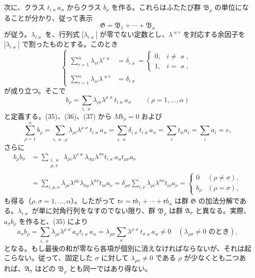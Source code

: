 次に、クラス $t_{i\varkappa}a_\varkappa$ からクラス $b_\rho$ を作る。これらはふたたび群 $\mathfrak B_\rho$ の単位になることが分かり、従って表示
\[
 \mathfrak G=\mathfrak B_1+\cdots+\mathfrak B_\alpha
\]
が従う。$\lambda_{i\varkappa}$ を、行列式 $|\lambda_{i\varkappa}|$ が零でない定数とし、$\lambda^{\varkappa r}$ を対応する余因子を $|\lambda_{i\varkappa}|$ で割ったものとする。このとき
\begin{equation}
\left\{
\begin{aligned}
 \sum_{r=1}^{\alpha}\lambda_{ri}\lambda^{r\varkappa}&=\delta_{i\varkappa}=\begin{cases}0,&i\ne\varkappa,\\1,&i=\varkappa,
 \end{cases}\\
 \sum_{r=1}^{\alpha}\lambda_{ir}\lambda^{\varkappa r}&=\delta_{i\varkappa}
\end{aligned}\right.
\tag{36}
\end{equation}
が成り立つ。そこで
\begin{equation}
 b_\rho=\sum_{i,\varkappa}\lambda_{\rho i}\lambda^{\rho\varkappa}t_{i\varkappa}a_\varkappa
 \qquad(\rho=1,
\ldots,\alpha)
\tag{37}
\end{equation}
と定義する。(35)、(36)、(37) から $Mb_\rho=0$ および
\begin{equation}
 \sum_{\rho=1}^{\alpha}b_\rho
 =\sum_{i,\varkappa,\rho}\lambda_{\rho i}\lambda^{\rho\varkappa}t_{i\varkappa}a_\varkappa
 =\sum_{i,\varkappa}\delta_{i\varkappa}t_{i\varkappa}a_\varkappa
 =\sum_i t_{ii}a_i=\sum_i a_i=e,
\tag{38}
\end{equation}
さらに
\[
\begin{aligned}
 b_\rho b_\sigma
 &=\sum_{\substack{i,\varkappa\\ \mu,\nu}}
  \lambda_{\rho i}\lambda^{\rho\varkappa}\lambda_{\sigma\mu}\lambda^{\sigma\nu}
  t_{i\varkappa}a_\varkappa t_{\mu\nu}a_\nu \\
 &=\sum_{i,\mu,\nu}\lambda_{\rho i}\lambda^{\rho\mu}\lambda_{\sigma\mu}\lambda^{\sigma\nu}t_{i\nu}a_\nu
 =\delta_{\rho\sigma}\sum_{i,\nu}\lambda_{\rho i}\lambda^{\sigma\nu}t_{i\nu}a_\nu
 =\begin{cases}0&(\rho\ne\sigma),\\ b_\rho&(\rho=\sigma),\end{cases}
\end{aligned}
\]
も得る（$\rho,\sigma=1,\ldots,\alpha$）。したがって $\mathfrak r e=\mathfrak r b_1+\cdots+\mathfrak r b_\alpha$ は群 $\mathfrak G$ の加法分解である。$\lambda_{i\varkappa}$ が単に対角行列をなすのでない限り、群 $\mathfrak B_\rho$ は群 $\mathfrak A_\sigma$ と異なる。実際、$a_\sigma b_\rho$ を作ると、(35) により
\[
 a_\sigma b_\rho
 =\sum_{i,\varkappa}\lambda_{\rho i}\lambda^{\rho\varkappa}a_\sigma t_{i\varkappa}a_\varkappa
 =\lambda_{\rho\sigma}
 \sum_\varkappa\lambda^{\rho\varkappa}t_{\sigma\varkappa}a_\varkappa\ne0
 \quad(\lambda_{\rho\sigma}\ne0\text{ のとき}),
\]
となる。もし最後の和が零なら各項が個別に消えなければならないが、それは起こらない。従って、固定した $\sigma$ に対して $\lambda_{\rho\sigma}\ne0$ である $\rho$ が少なくとも二つあれば、$\mathfrak A_\sigma$ はどの $\mathfrak B_\rho$ とも同一ではあり得ない。

